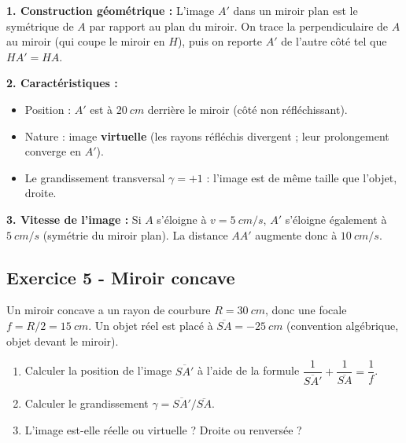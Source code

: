 \documentclass[12pt,a4paper]{article}
\begin{document}
\begin{boitecorrige}
\textbf{1. Construction géométrique :} L'image $A'$ dans un miroir plan est le symétrique de $A$ par rapport au plan du miroir. On trace la perpendiculaire de $A$ au miroir (qui coupe le miroir en $H$), puis on reporte $A'$ de l'autre côté tel que $HA' = HA$.

\textbf{2. Caractéristiques :}
\begin{itemize}
  \item Position : $A'$ est à $\qty{20}{cm}$ derrière le miroir (côté non réfléchissant).
  \item Nature : image \textbf{virtuelle} (les rayons réfléchis divergent ; leur prolongement converge en $A'$).
  \item Le grandissement transversal $\gamma = +1$ : l'image est de même taille que l'objet, droite.
\end{itemize}

\textbf{3. Vitesse de l'image :} Si $A$ s'éloigne à $v = \qty{5}{cm/s}$, $A'$ s'éloigne également à $\qty{5}{cm/s}$ (symétrie du miroir plan). La distance $AA'$ augmente donc à $\qty{10}{cm/s}$.
\end{boitecorrige}

\subsection*{Exercice 5 - Miroir concave \niveau{\moyen}}

\begin{boiteexercice}
Un miroir concave a un rayon de courbure $R = \qty{30}{cm}$, donc une focale $f = R/2 = \qty{15}{cm}$.
Un objet réel est placé à $\overline{SA} = -\qty{25}{cm}$ (convention algébrique, objet devant le miroir).
\begin{enumerate}
  \item Calculer la position de l'image $\overline{SA'}$ à l'aide de la formule $\dfrac{1}{\overline{SA'}} + \dfrac{1}{\overline{SA}} = \dfrac{1}{f}$.
  \item Calculer le grandissement $\gamma = \overline{SA'}/\overline{SA}$.
  \item L'image est-elle réelle ou virtuelle ? Droite ou renversée ?
\end{enumerate}
\end{boiteexercice}
\end{document}
